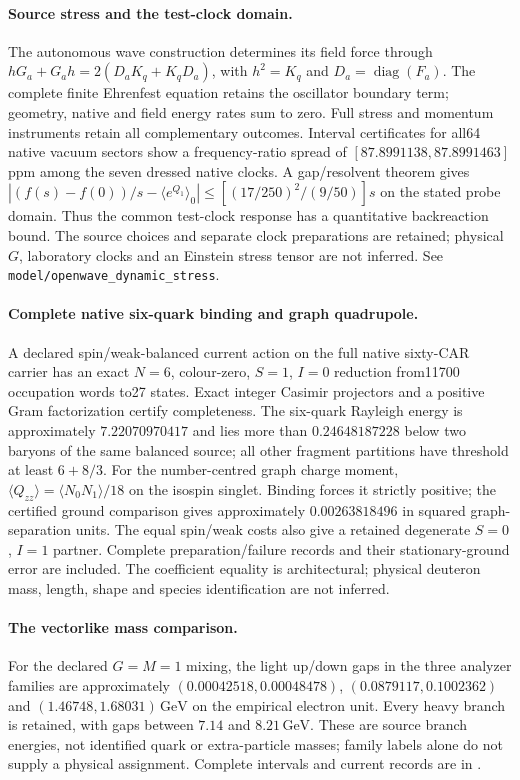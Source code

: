 \paragraph{Source stress and the test-clock domain.}
The autonomous wave construction determines its field force through
$hG_a+G_ah=2(D_aK_q+K_qD_a)$, with $h^2=K_q$ and
$D_a=\operatorname{diag}(F_a)$. The complete finite Ehrenfest equation
retains the oscillator boundary term; geometry, native and field energy
rates sum to zero. Full stress and momentum instruments retain all
complementary outcomes. Interval certificates for all64 native vacuum
sectors show a frequency-ratio spread of
$[87.8991138,87.8991463]$ppm among the seven dressed native clocks.
A gap/resolvent theorem gives
$|(f(s)-f(0))/s-\langle e^{Q_1}\rangle_0|
\leq[(17/250)^2/(9/50)]s$ on the stated probe domain. Thus the common
test-clock response has a quantitative backreaction bound. The source
choices and separate clock preparations are retained; physical $G$,
laboratory clocks and an Einstein stress tensor are not inferred.
See \texttt{model/openwave\_dynamic\_stress}.


\paragraph{Complete native six-quark binding and graph quadrupole.}
A declared spin/weak-balanced current action on the full native sixty-CAR
carrier has an exact $N=6$, colour-zero, $S=1$, $I=0$ reduction from11700
occupation words to27 states. Exact integer Casimir projectors and a positive
Gram factorization certify completeness. The six-quark Rayleigh energy is
approximately $7.22070970417$ and lies more than $0.24648187228$ below two
baryons of the same balanced source; all other fragment partitions have
threshold at least $6+8/3$.
For the number-centred graph charge moment,
$\langle Q_{zz}\rangle=\langle N_0N_1\rangle/18$ on the isospin singlet.
Binding forces it strictly positive; the certified ground comparison gives
approximately $0.00263818496$ in squared graph-separation units. The equal
spin/weak costs also give a retained degenerate $S=0$, $I=1$ partner.
Complete preparation/failure records and their stationary-ground error are
included. The coefficient equality is architectural; physical deuteron mass,
length, shape and species identification are not inferred.


\paragraph{The vectorlike mass comparison.}
For the declared $G=M=1$ mixing, the light up/down gaps in the three
analyzer families are approximately $(0.00042518,0.00048478)$,
$(0.0879117,0.1002362)$ and $(1.46748,1.68031)\,\mathrm{GeV}$ on the
empirical electron unit. Every heavy branch is retained, with gaps
between $7.14$ and $8.21\,\mathrm{GeV}$. These are source branch
energies, not identified quark or extra-particle masses; family labels
alone do not supply a physical assignment. Complete intervals and current records
are in .

